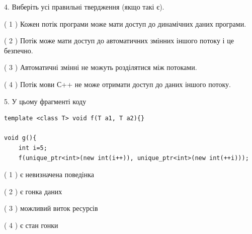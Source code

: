 \documentclass[12pt, ukrainian]{article}
\begin{document}
\begin {large}
{%
4. Виберіть усі правильні твердження (якщо такі є).\par
\vspace{2mm}

( 1 ) Кожен потік програми може мати доступ до динамічних даних програми.%

( 2 ) Потік може мати доступ до автоматичних змінних іншого потоку і це безпечно.%

( 3 ) Автоматичні змінні не можуть розділятися між потоками.%

( 4 ) Потік мови С++ не може отримати доступ до даних іншого потоку.%


5. У цьому фрагменті коду
\begin{verbatim}
template <class T> void f(T a1, T a2){}

void g(){
    int i=5;
    f(unique_ptr<int>(new int(i++)), unique_ptr<int>(new int(++i)));
\end{verbatim}

( 1 ) є невизначена поведінка%

( 2 ) є гонка даних%

( 3 ) можливий виток ресурсів%

( 4 ) є стан гонки%
}
\end {large}
\end{document}
